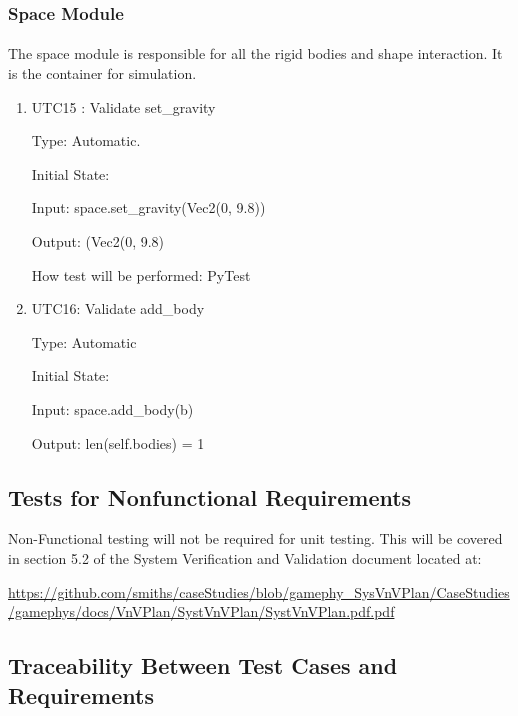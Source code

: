 \documentclass[12pt, titlepage]{article}
\begin{document}
\subsubsection{Space Module}

\paragraph{}
The space module is responsible for all the rigid bodies and shape interaction. It is the container for simulation.
\begin{enumerate}
	
	
	\item{UTC15} {: Validate set\_gravity \\}
	
	Type: Automatic.
	
	Initial State: 
	
	Input: space.set\_gravity(Vec2(0, 9.8))
	
	Output: (Vec2(0, 9.8)
	
	How test will be performed: PyTest 
	
	\item{UTC16}{: Validate add\_body\\}
	
	Type: Automatic
	
	Initial State: 
	
	Input: space.add\_body(b)
	
	Output: len(self.bodies) = 1
	

	\end{enumerate}

\subsection{Tests for Nonfunctional Requirements}

Non-Functional testing will not be required for unit testing. This will be covered in section 5.2 of the System Verification and Validation document located at: 

\url{https://github.com/smiths/caseStudies/blob/gamephy_SysVnVPlan/CaseStudies/gamephys/docs/VnVPlan/SystVnVPlan/SystVnVPlan.pdf.pdf}

\subsection{Traceability Between Test Cases and Requirements}
\end{document}
